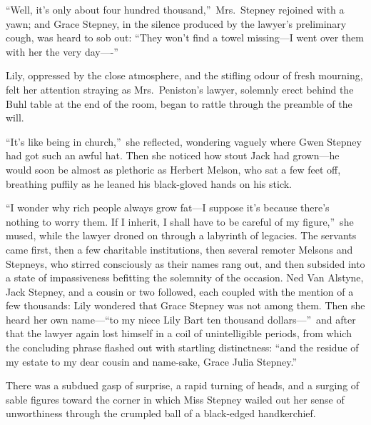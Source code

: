 \documentclass[12pt,a4paper]{book}
\begin{document}
``Well, it's only about four hundred thousand,''\ Mrs.\ Stepney
rejoined with a yawn; and Grace Stepney, in the silence produced
by the lawyer's preliminary cough, was heard to sob out: ``They
won't find a towel missing---I went over them with her the very
day----''





Lily, oppressed by the close atmosphere, and the stifling odour
of fresh mourning, felt her attention straying as Mrs.\ Peniston's
lawyer, solemnly erect behind the Buhl table at the end of the
room, began to rattle through the preamble of the will.





``It's like being in church,''\ she reflected, wondering vaguely
where Gwen Stepney had got such an awful hat. Then she noticed
how stout Jack had grown---he would soon be almost as plethoric as
Herbert Melson, who sat a few feet off, breathing puffily as he
leaned his black-gloved hands on his stick.





``I wonder why rich people always grow fat---I suppose it's because
there's nothing to worry them. If I inherit, I shall have to be
careful of my figure,''\ she mused, while the lawyer droned on
through a labyrinth of legacies. The servants came first, then a
few charitable institutions, then several remoter Melsons and
Stepneys, who stirred consciously as their names rang out, and
then subsided into a state of impassiveness befitting the
solemnity of the occasion. Ned Van Alstyne, Jack Stepney, and a
cousin or two followed, each coupled with the mention of a few
thousands: Lily wondered that Grace Stepney was not among them. 
Then she heard her own name---``to my niece Lily Bart ten thousand
dollars---''\ and after that the lawyer again lost himself in a coil
of unintelligible periods, from which the concluding phrase
flashed out with startling distinctness: ``and the residue of my
estate to my dear cousin and name-sake, Grace Julia Stepney.''





There was a subdued gasp of surprise, a rapid turning of heads,
and a surging of sable figures toward the corner in which Miss
Stepney wailed out her sense of unworthiness through the crumpled
ball of a black-edged handkerchief.
\end{document}
